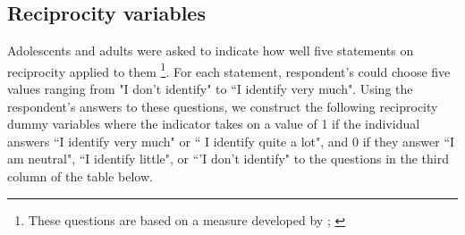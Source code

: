 \subsection{Reciprocity variables}
Adolescents and adults were asked to indicate how well five statements on reciprocity applied to them \footnote{These questions are based on a measure developed by \cite{Perugini-etal_2003_EJP}; \cite{Dohmen_Falk_etal_2009_EJ}}. For each statement, respondent's could choose five values ranging from  "I don't identify" to ``I identify very much". Using the respondent's answers to these questions, we construct the following reciprocity dummy variables where the indicator takes on a value of 1 if the individual answers ``I identify very much" or `` I identify quite a lot", and 0 if they answer ``I am neutral", ``I identify little", or ``'I don't identify" to the questions in the third column of the table below.
\begin{table}[H]
\begin{center}
\end{center}
\end{table}

